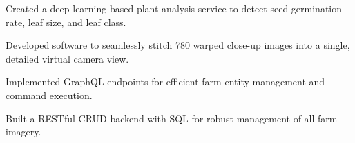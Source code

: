 \documentclass[]{deedy-resume-openfont}
\begin{document}
{}
\hfill{}

\vspace{-4pt}
\begin{tightemize}%


\item Created a deep learning-based plant analysis service to detect seed germination rate, leaf size, and leaf class.
\item Developed software to seamlessly stitch 780 warped close-up images into a single, detailed virtual camera view.
\item Implemented GraphQL endpoints for efficient farm entity management and command execution.
\item Built a RESTful CRUD backend with SQL for robust management of all farm imagery.

\end{tightemize}
\sectionsep







\end{document}
